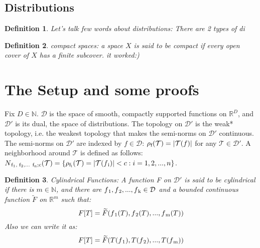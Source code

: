 \documentclass{article}
\newtheorem{definition}{Definition}[subsection]
\theoremstyle{definition}
\begin{document}
\subsection{Distributions}
\begin{definition}
    Let's talk few words about distributions: There are 2 types of di
\end{definition}
\begin{definition}
    compact spaces: a space $X$ is said to be compact if every open cover of $X$ has a finite subcover. it worked:)
\end{definition}





\section{The Setup and some proofs}
Fix $D\in\mathbb{N}$.
$\mathcal{D}$ is the space of smooth, compactly supported functions on $\mathbb{R}^D$, and $\mathcal{D'}$ is its dual, the space of distributions. The topology on $\mathcal{D'}$ is the weak* topology, i.e. the weakest topology that makes the semi-norms on $\mathcal{D'}$ continuous.\\ 
The semi-norms on $\mathcal{D'}$ are indexed by $f\in\mathcal{D}$: $\rho\textsubscript{f}(\mathcal{T}) = | \mathcal{T}(f)|$ for any $\mathcal{T} \in \mathcal{D'}$. A neighborhood around $\mathcal{T}$ is defined as follows: \\
$N\textsubscript{f\textsubscript{1}, f\textsubscript{2},... f\textsubscript{n};c}(\mathcal{T}) = \{ \rho\textsubscript{f\textsubscript{i}}(\mathcal{T}) = | \mathcal{T}(f\textsubscript{i})| < c: i=1, 2, ..., n\}$.\\



\begin{definition}
    Cylindrical Functions: A function F on $\mathcal{D'}$ is said to be cylindrical if there is $m \in \mathbb{N}$, and there are $f\textsubscript{1}, f\textsubscript{2}, ..., f\textsubscript{k} \in \mathcal{D}$ and a bounded continuous function $\widetilde{F}$ on $\mathbb{R}^m$ such that:
\[
F[T] = \widetilde{F} (f\textsubscript{1}(T), f\textsubscript{2}(T), ..., f\textsubscript{m}(T))\]
Also we can write it as:
\[
F[T] = \widetilde{F} (T(f\textsubscript{1}), T(f\textsubscript{2}), ..., T(f\textsubscript{m}))
\]

\end{definition}
\end{document}
